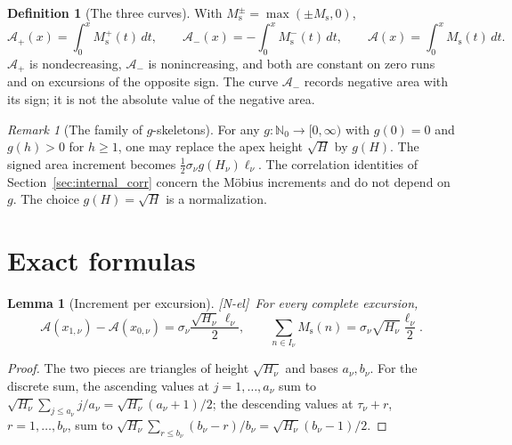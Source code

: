 \documentclass[11pt]{amsart}
\numberwithin{equation}{section}
\theoremstyle{plain}
\newtheorem{lemma}[theorem]{Lemma}
\theoremstyle{definition}
\newtheorem{definition}[theorem]{Definition}
\theoremstyle{remark}
\newtheorem{remark}[theorem]{Remark}
\newcommand{\Ms}{M_{\mathrm{s}}}
\newcommand{\Ap}{\mathcal{A}_{+}}
\newcommand{\Am}{\mathcal{A}_{-}}
\newcommand{\Anet}{\mathcal{A}}
\newcommand{\tagNE}{\textup{[N-el]}}
\begin{document}
\begin{definition}[The three curves]
\label{def:areas}
With $\Ms^{\pm}=\max(\pm\Ms,0)$,
\begin{equation}
\label{eq:areas_def}
\Ap(x)=\int_0^x\Ms^+(t)\,dt,\qquad
\Am(x)=-\int_0^x\Ms^-(t)\,dt,\qquad
\Anet(x)=\int_0^x\Ms(t)\,dt.
\end{equation}
$\Ap$ is nondecreasing, $\Am$ is nonincreasing, and both are constant on
zero runs and on excursions of the opposite sign.  The curve $\Am$ records
negative area with its sign; it is not the absolute value of the negative
area.
\end{definition}

\begin{remark}[The family of $g$-skeletons]
\label{rem:g-skeleton}
For any $g:\mathbb N_0\to[0,\infty)$ with $g(0)=0$ and $g(h)>0$ for $h\ge1$,
one may replace the apex height $\sqrt H$ by $g(H)$. The signed area
increment becomes $\tfrac12\sigma_\nu g(H_\nu)\ell_\nu$. The correlation
identities of Section~\ref{sec:internal_corr} concern the M\"obius
increments and do not depend on $g$. The choice $g(H)=\sqrt H$ is a
normalization.
\end{remark}


\section{Exact formulas}
\label{sec:formulas}

\begin{lemma}[Increment per excursion]
\label{lem:jump}
\tagNE\ For every complete excursion,
\begin{equation}
\label{eq:jump}
\Anet(x_{1,\nu})-\Anet(x_{0,\nu})
=\sigma_\nu\frac{\sqrt{H_\nu}\,\ell_\nu}{2},
\qquad
\sum_{n\in I_\nu}\Ms(n)
=\sigma_\nu\sqrt{H_\nu}\frac{\ell_\nu}{2}.
\end{equation}
\end{lemma}

\begin{proof}
The two pieces are triangles of height $\sqrt{H_\nu}$ and bases $a_\nu,b_\nu$.
For the discrete sum, the ascending values at $j=1,\ldots,a_\nu$ sum to
$\sqrt{H_\nu}\sum_{j\le a_\nu}j/a_\nu=\sqrt{H_\nu}(a_\nu+1)/2$; the
descending values at $\tau_\nu+r$, $r=1,\ldots,b_\nu$, sum to
$\sqrt{H_\nu}\sum_{r\le b_\nu}(b_\nu-r)/b_\nu=\sqrt{H_\nu}(b_\nu-1)/2$.
\end{proof}
\end{document}
